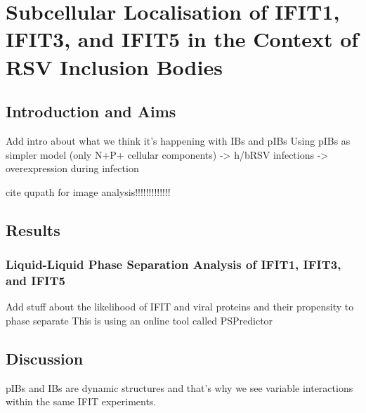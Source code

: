 \chapter{Subcellular Localisation of IFIT1, IFIT3, and IFIT5 in the Context of RSV Inclusion Bodies} \label{ch:Subcellular Localisation of IFIT1, IFIT3, and IFIT5 in the Context of RSV Inclusion Bodies}

\section{Introduction and Aims} \label{sec:Introduction and Aims-Chapter4}
Add intro about what we think it’s happening with IBs and pIBs \newline
Using pIBs as simpler model (only N+P+ cellular components) -> h/bRSV infections -> overexpression during infection


cite qupath for image analysis!!!!!!!!!!!!!


\section{Results} \label{sec:Results-Chapter4}





\subsection{Liquid-Liquid Phase Separation Analysis of IFIT1, IFIT3, and IFIT5} \label{subsec:Liquid-Liquid Phase Separation Analysis of IFIT1, IFIT3, and IFIT5}
Add stuff about the likelihood of IFIT and viral proteins and their propensity to phase separate \newline
This is using an online tool called PSPredictor


\section{Discussion} \label{sec:Discussion-Chapter4}
pIBs and IBs are dynamic structures and that’s why we see variable interactions within the same IFIT experiments.